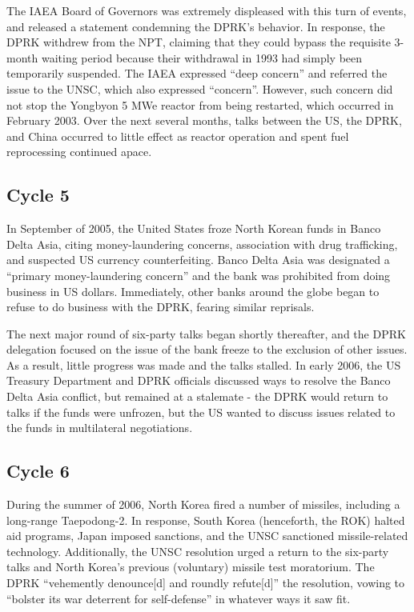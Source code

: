 \documentclass{article}
\begin{document}
The IAEA Board of Governors was extremely displeased with this turn of events, and released a statement condemning the DPRK’s behavior\cite{iaea03}. In response, the DPRK withdrew from the NPT, claiming that they could bypass the requisite 3-month waiting period because their withdrawal in 1993 had simply been temporarily suspended\cite{kcna4}. The IAEA expressed “deep concern” and referred the issue to the UNSC, which also expressed “concern”\cite{iaea09}. However, such concern did not stop the Yongbyon 5 MWe reactor from being restarted, which occurred in February 2003\cite{davenport}. Over the next several months, talks between the US, the DPRK, and China occurred to little effect as reactor operation and spent fuel reprocessing continued apace\cite{davenport}.

\subsection{Cycle 5}
In September of 2005, the United States froze North Korean funds in Banco Delta Asia, citing money-laundering concerns, association with drug trafficking, and suspected US currency counterfeiting\cite{davenport}. Banco Delta Asia was designated a “primary money-laundering concern” and the bank was prohibited from doing business in US dollars. Immediately, other banks around the globe began to refuse to do business with the DPRK, fearing similar reprisals\cite{greenlees}.

The next major round of six-party talks began shortly thereafter, and the DPRK delegation focused on the issue of the bank freeze to the exclusion of other issues\cite{greenlees}. As a result, little progress was made and the talks stalled. In early 2006, the US Treasury Department and DPRK officials discussed ways to resolve the Banco Delta Asia conflict, but remained at a stalemate - the DPRK would return to talks if the funds were unfrozen, but the US wanted to discuss issues related to the funds in multilateral negotiations\cite{greenlees}.

\subsection{Cycle 6}

During the summer of 2006, North Korea fired a number of missiles, including a long-range Taepodong-2. In response, South Korea (henceforth, the ROK) halted aid programs, Japan imposed sanctions, and the UNSC sanctioned missile-related technology\cite{greenlees}. Additionally, the UNSC resolution urged a return to the six-party talks and North Korea’s previous (voluntary) missile test moratorium\cite{unsc06}. The DPRK “vehemently denounce[d] and roundly refute[d]” the resolution, vowing to “bolster its war deterrent for self-defense” in whatever ways it saw fit\cite{kcna5}.
\end{document}
